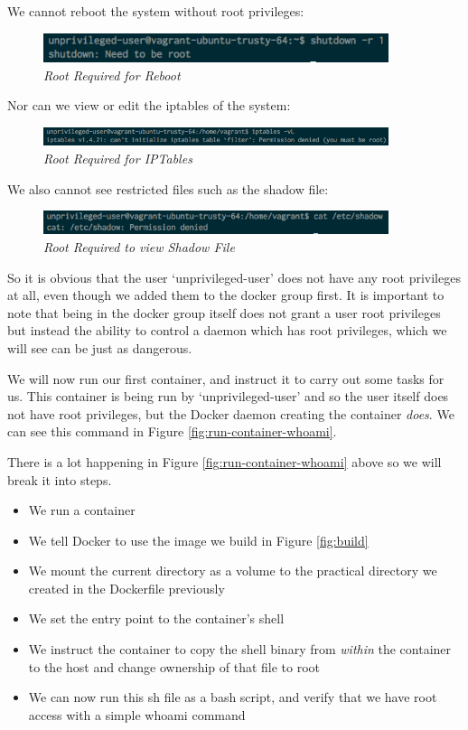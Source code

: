 \documentclass{article}
\begin{document}
We cannot reboot the system without root privileges:
\begin{figure}[!h]
\centering
\includegraphics*[width=0.9\textwidth]{components/images/non-root-reboot}
\caption{\em Root Required for Reboot}
\label{fig:non-root-reboot}
\end{figure}

Nor can we view or edit the iptables of the system:
\begin{figure}[!h]
\centering
\includegraphics*[width=0.9\textwidth]{components/images/non-root-iptables}
\caption{\em Root Required for IPTables}
\label{fig:non-root-iptables}
\end{figure}

We also cannot see restricted files such as the shadow file:
\begin{figure}[!h]
\centering
\includegraphics*[width=0.9\textwidth]{components/images/non-root-shadow}
\caption{\em Root Required to view Shadow File}
\label{fig:non-root-shadow}
\end{figure}

So it is obvious that the user `unprivileged-user' does not have any root privileges at all, even though we added them to the docker group first. It is important to note that being in the docker group itself does not grant a user root privileges but instead the ability to control a daemon which has root privileges, which we will see can be just as dangerous. 

We will now run our first container, and instruct it to carry out some tasks for us. This container is being run by `unprivileged-user' and so the user itself does not have root privileges, but the Docker daemon creating the container \textit{does}. We can see this command in Figure \ref{fig:run-container-whoami}.

There is a lot happening in Figure \ref{fig:run-container-whoami} above so we will break it into steps. 

\begin{itemize}
  \item We run a container
  \item We tell Docker to use the image we build in Figure \ref{fig:build}
  \item We mount the current directory as a volume to the practical directory we created in the Dockerfile previously
  \item We set the entry point to the container's shell
  \item We instruct the container to copy the shell binary from \textit{within} the container to the host and change ownership of that file to root
  \item We can now run this sh file as a bash script, and verify that we have root access with a simple whoami command
\end{itemize}
\end{document}
